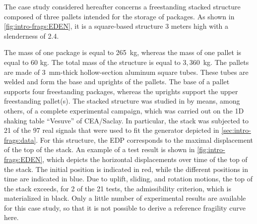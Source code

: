     The case study considered hereafter concerns a freestanding stacked structure composed of three pallets intended for the storage of packages. As shown in \cref{fig:intro-frags:EDEN}, it is a square-based structure 3 meters high with a slenderness of 2.4.
    
    
    
    The mass of one package is equal to 265~kg, whereas the mass of one pallet is equal to 60 kg. The total mass of the structure is equal to $3,360$~kg. The pallets are made of 3~mm-thick hollow-section aluminum square tubes. These tubes are welded and form the base and uprights of the pallets. The base of a pallet supports four freestanding packages, whereas the uprights support the upper freestanding pallet(s). The stacked structure was studied in \cite{beylat_contribution_2020} by means, among others, of a complete experimental campaign, which was carried out on the 1D shaking table ``Vesuve'' of CEA/Saclay. In particular, the stack was subjected to 21 of the 97 real signals that were used to fit the generator depicted in \cref{sec:intro-frags:data}.
    For this structure, the EDP corresponds to the maximal displacement of the top of the stack.
    An example of a test result is shown in \cref{fig:intro-frags:EDEN}, which depicts the horizontal displacements over time of the top of the stack. The initial position is indicated in red, while the different positions in time are indicated in blue. {Due to uplift, sliding, and rotation motions, the top of the stack exceeds, for 2 of the 21 tests, the admissibility criterion, which is materialized in black. }
    Only a little number of experimental results are available for this case study, so that it is not possible to derive a reference fragility curve here.





